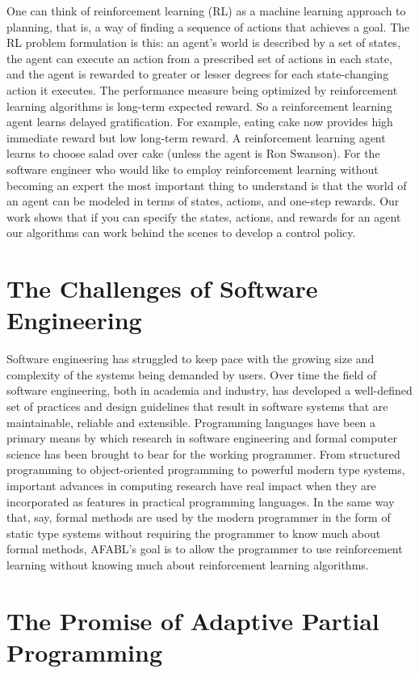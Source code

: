 One can think of reinforcement learning (RL) as a machine learning approach to planning, that is, a way of finding a sequence of actions that achieves a goal.  The RL problem formulation is this: an agent's world is described by a set of states, the agent can execute an action from a prescribed set of actions in each state, and the agent is rewarded to greater or lesser degrees for each state-changing action it executes. The performance measure being optimized by reinforcement learning algorithms is long-term expected reward. So a reinforcement learning agent learns delayed gratification. For example, eating cake now provides high immediate reward but low long-term reward. A reinforcement learning agent learns to choose salad over cake (unless the agent is Ron Swanson). For the software engineer who would like to employ reinforcement learning without becoming an expert the most important thing to understand is that the world of an agent can be modeled in terms of states, actions, and one-step rewards. Our work shows that if you can specify the states, actions, and rewards for an agent our algorithms can work behind the scenes to develop a control policy.

\section{The Challenges of Software Engineering}

Software engineering has struggled to keep pace with the growing size and complexity of the systems being demanded by users. Over time the field of software engineering, both in academia and industry, has developed a well-defined set of practices and design guidelines that result in software systems that are maintainable, reliable and extensible. Programming languages have been a primary means by which research in software engineering and formal computer science has been brought to bear for the working programmer. From structured programming to object-oriented programming to powerful modern type systems, important advances in computing research have real impact when they are incorporated as features in practical programming languages. In the same way that, say, formal methods are used by the modern programmer in the form of static type systems without requiring the programmer to know much about formal methods, AFABL's goal is to allow the programmer to use reinforcement learning without knowing much about reinforcement learning algorithms.

\section{The Promise of Adaptive Partial Programming}

